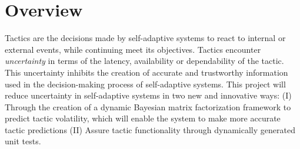 \documentclass[12pt]{article}
\begin{document}
\begin{titlepage}
\begin{tabular}{ L{15mm} L{120mm} }



\end{tabular}




 \end{titlepage}

\cfoot{\thepage}
\setcounter{tocdepth}{1} %

\cfoot{} %








\setcounter{page}{1}



\section*{Overview}

Tactics are the decisions made by self-adaptive systems to react to internal or external events, while continuing meet its objectives. Tactics encounter \emph{uncertainty} in terms of the latency, availability or dependability of the tactic. This uncertainty inhibits the creation of accurate and trustworthy information used in the decision-making process of self-adaptive systems. This project will reduce uncertainty in self-adaptive systems in two new and innovative ways: (I) Through the creation of a dynamic Bayesian matrix factorization framework to predict tactic volatility, which will enable the system to make more accurate tactic predictions (II) Assure tactic functionality through dynamically generated unit tests.
\end{document}
